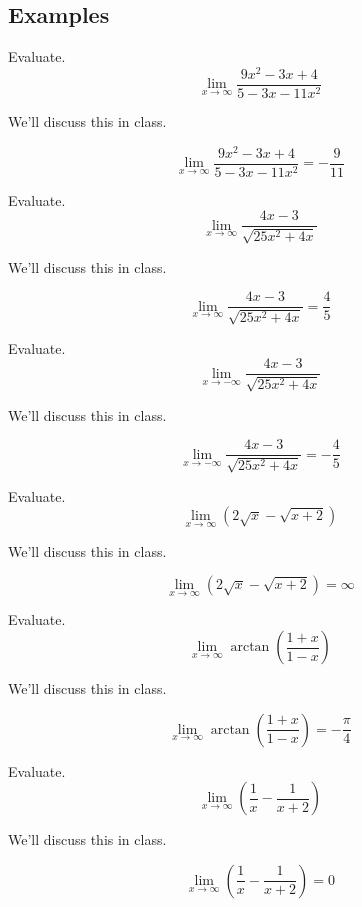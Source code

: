 \documentclass[12pt,addpoints, answers, fleqn]{exam}
\begin{document}
 
\subsection{Examples}
\begin{questions}
\question Evaluate.
\[
\lim_{x \to \infty} \frac{9x^2-3x+4}{5-3x-11x^2}
\]

\begin{solution}
We'll discuss this in class.

\[
\lim_{x \to \infty} \frac{9x^2-3x+4}{5-3x-11x^2} = -\frac{9}{11}
\]
\end{solution}

\question Evaluate.
\[
\lim_{x \to \infty} \frac{4x-3}{\sqrt{25x^2+4x}}
\]

\begin{solution}
We'll discuss this in class.

\[
\lim_{x \to \infty} \frac{4x-3}{\sqrt{25x^2+4x}} = \frac{4}{5}
\]
\end{solution}


\question Evaluate.
\[
\lim_{x \to -\infty} \frac{4x-3}{\sqrt{25x^2+4x}}
\]

\begin{solution}
We'll discuss this in class.

\[
\lim_{x \to -\infty} \frac{4x-3}{\sqrt{25x^2+4x}} = -\frac{4}{5}
\]
\end{solution}


\question Evaluate.
\[
\lim_{x \to \infty} \left( 2\sqrt{x} - \sqrt{x+2} \right)
\]

\begin{solution}
We'll discuss this in class.

\[
\lim_{x \to \infty} \left( 2\sqrt{x} - \sqrt{x+2} \right) = \infty
\]
\end{solution}


\question Evaluate.
\[
\lim_{x \to \infty} \arctan \left( \frac{1+x}{1-x}\right)
\]

\begin{solution}
We'll discuss this in class.

\[
\lim_{x \to \infty} \arctan \left( \frac{1+x}{1-x}\right) = - \frac{\pi}{4}
\]
\end{solution}


\question Evaluate.
\[
\lim_{x \to \infty}  \left( \frac{1}{x} - \frac{1}{x+2}\right)
\]

\begin{solution}
We'll discuss this in class.

\[
\lim_{x \to \infty}  \left( \frac{1}{x} - \frac{1}{x+2}\right) = 0
\]
\end{solution}



\end{questions}
\end{document}
